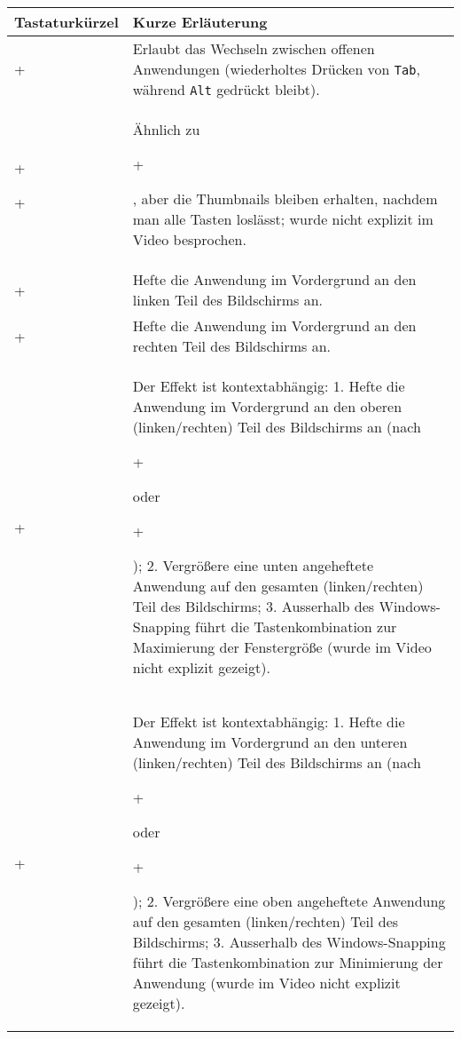 \documentclass[11pt,a4paper]{scrartcl}
\newcommand*\keystroke[1]{%
  \begin{tikzpicture}[baseline=(key.base), very thin, line cap=round, black, rounded corners=0pt]%
    \node [draw, fill=white, fill opacity=1, rectangle, rounded corners=2pt, inner sep=1pt, minimum width=1.2em, font=\scriptsize\sffamily] (key) {#1\strut};

    \begin{scope}[on background layer]
      \draw [rounded corners=1pt, fill=white] ($ (key.north west) + (-2pt, 2pt) $) rectangle ($ (key.south east) + (2pt, -2pt) $);

      \fill [gray!60] ($ (key.south west) + (2pt, 0.1pt) $) -- ($ (key.south west) + (-1pt, -2pt) $)
                  -- ($ (key.south east) + (1pt, -2pt) $)  -- ($ (key.south east) + (-2pt, 0.1pt) $) -- cycle;

      \fill [gray!60] ($ (key.south east) + (-0.1pt, 2pt) $) -- ($ (key.south east) + (2pt, -1pt) $)
                  -- ($ (key.north east) + (2pt, 1pt) $)    -- ($ (key.north east) + (-0.1pt, -2pt) $) -- cycle;
    \end{scope}

    \draw ($ (key.north west) + (0.1pt, -2pt) $) -- ($ (key.north west) + (-2pt, 1pt) $);
    \draw ($ (key.north west) + (2pt, -0.1pt) $) -- ($ (key.north west) + (-1pt, 2pt) $);

    \draw ($ (key.north east) + (-0.1pt, -2pt) $) -- ($ (key.north east) + (2pt, 1pt) $);
    \draw ($ (key.north east) + (-2pt, -0.1pt) $) -- ($ (key.north east) + (1pt, 2pt) $);

    \draw ($ (key.south west) + (0.1pt, 2pt) $) -- ($ (key.south west) + (-2pt, -1pt) $);
    \draw ($ (key.south west) + (2pt, 0.1pt) $) -- ($ (key.south west) + (-1pt, -2pt) $);

    \draw ($ (key.south east) + (-0.1pt, 2pt) $) -- ($ (key.south east) + (2pt, -1pt) $);
    \draw ($ (key.south east) + (-2pt, 0.1pt) $) -- ($ (key.south east) + (1pt, -2pt) $);
  \end{tikzpicture}%
}
\newcommand{\WindowsLogo}{\raisebox{-0.1em}{%
  \texttt{[image: Windows\_3\_logo\_simplified]}}}
\begin{document}
\begin{center}
  \begin{tabularx}{0.9\textwidth}{lX}
  \toprule
  Tastaturkürzel & Kurze Erläuterung \\
  \midrule
  \keystroke{Alt}+\keystroke{Tab} & Erlaubt das Wechseln zwischen offenen   Anwendungen (wiederholtes Drücken von \texttt{Tab}, während \texttt{Alt} gedrückt bleibt).\\
  \keystroke{Ctrl}+\keystroke{Alt}+\keystroke{Tab} & Ähnlich zu
  \keystroke{Alt}+\keystroke{Tab}, aber die Thumbnails bleiben erhalten,
  nachdem man alle Tasten loslässt; wurde nicht explizit im Video besprochen. \\
  \midrule
  \keystroke{\WindowsLogo}+\keystroke{$\leftarrow$} & Hefte die Anwendung im Vordergrund an den linken Teil des Bildschirms an. \\
  \keystroke{\WindowsLogo}+\keystroke{$\rightarrow$} & Hefte die Anwendung im Vordergrund an den rechten Teil des Bildschirms an. \\
  \midrule
  \keystroke{\WindowsLogo}+\keystroke{$\uparrow$} & Der Effekt ist
  kontextabhängig: 1. Hefte die Anwendung im Vordergrund an den oberen
  (linken/rechten) Teil des Bildschirms an (nach
  \keystroke{\WindowsLogo}+\keystroke{$\leftarrow$} oder
  \keystroke{\WindowsLogo}+\keystroke{$\rightarrow$}); 2. Vergrößere
  eine unten angeheftete Anwendung auf den gesamten (linken/rechten)
  Teil des Bildschirms; 3. Ausserhalb des Windows-Snapping führt die
  Tastenkombination zur Maximierung der Fenstergröße (wurde im Video
  nicht explizit gezeigt). \\
  \keystroke{\WindowsLogo}+\keystroke{$\downarrow$} & Der Effekt ist
  kontextabhängig: 1. Hefte die Anwendung im Vordergrund an den unteren
  (linken/rechten) Teil des Bildschirms an (nach
  \keystroke{\WindowsLogo}+\keystroke{$\leftarrow$} oder
  \keystroke{\WindowsLogo}+\keystroke{$\rightarrow$}); 2. Vergrößere
  eine oben angeheftete Anwendung auf den gesamten (linken/rechten) Teil
  des Bildschirms; 3. Ausserhalb des Windows-Snapping führt die
  Tastenkombination zur Minimierung der Anwendung (wurde im Video nicht
  explizit gezeigt). \\
  \bottomrule
  \end{tabularx}
\end{center}
%
\end{document}
